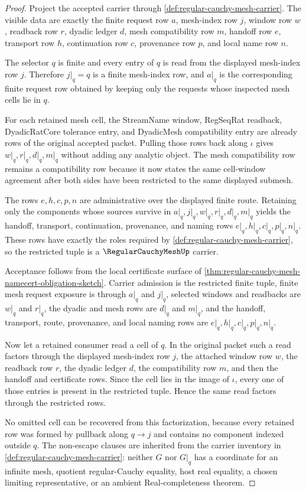 \begin{proof}
Project the accepted carrier through \autoref{def:regular-cauchy-mesh-carrier}. The visible data are exactly the finite request row $a$, mesh-index row $j$, window row $w$, readback row $r$, dyadic ledger $d$, mesh compatibility row $m$, handoff row $e$, transport row $h$, continuation row $c$, provenance row $p$, and local name row $n$.

The selector $q$ is finite and every entry of $q$ is read from the displayed mesh-index row $j$. Therefore $j\vert_q=q$ is a finite mesh-index row, and $a\vert_q$ is the corresponding finite request row obtained by keeping only the requests whose inspected mesh cells lie in $q$.

For each retained mesh cell, the StreamName window, RegSeqRat readback, DyadicRatCore tolerance entry, and DyadicMesh compatibility entry are already rows of the original accepted packet. Pulling those rows back along $\iota$ gives $w\vert_q,r\vert_q,d\vert_q,m\vert_q$ without adding any analytic object. The mesh compatibility row remains a compatibility row because it now states the same cell-window agreement after both sides have been restricted to the same displayed submesh.

The rows $e,h,c,p,n$ are administrative over the displayed finite route. Retaining only the components whose sources survive in $a\vert_q,j\vert_q,w\vert_q,r\vert_q,d\vert_q,m\vert_q$ yields the handoff, transport, continuation, provenance, and naming rows $e\vert_q,h\vert_q,c\vert_q,p\vert_q,n\vert_q$. These rows have exactly the roles required by \autoref{def:regular-cauchy-mesh-carrier}, so the restricted tuple is a $\RegularCauchyMeshUp$ carrier.

Acceptance follows from the local certificate surface of \autoref{thm:regular-cauchy-mesh-namecert-obligation-sketch}. Carrier admission is the restricted finite tuple, finite mesh request exposure is through $a\vert_q$ and $j\vert_q$, selected windows and readbacks are $w\vert_q$ and $r\vert_q$, the dyadic and mesh rows are $d\vert_q$ and $m\vert_q$, and the handoff, transport, route, provenance, and local naming rows are $e\vert_q,h\vert_q,c\vert_q,p\vert_q,n\vert_q$.

Now let a retained consumer read a cell of $q$. In the original packet such a read factors through the displayed mesh-index row $j$, the attached window row $w$, the readback row $r$, the dyadic ledger $d$, the compatibility row $m$, and then the handoff and certificate rows. Since the cell lies in the image of $\iota$, every one of those entries is present in the restricted tuple. Hence the same read factors through the restricted rows.

No omitted cell can be recovered from this factorization, because every retained row was formed by pullback along $q\to j$ and contains no component indexed outside $q$. The non-escape clauses are inherited from the carrier inventory in \autoref{def:regular-cauchy-mesh-carrier}: neither $G$ nor $G\vert_q$ has a coordinate for an infinite mesh, quotient regular-Cauchy equality, host real equality, a chosen limiting representative, or an ambient Real-completeness theorem.
\end{proof}
